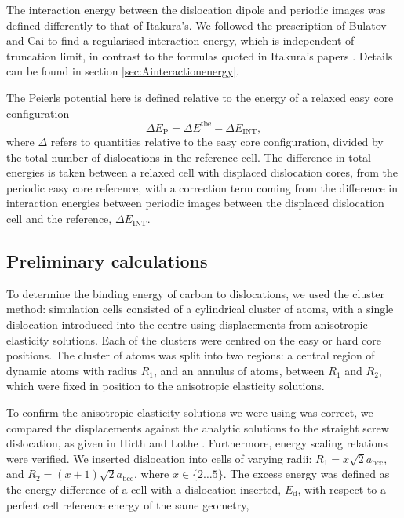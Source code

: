 \documentclass[a4paper,11pt]{article}
\begin{document}
The interaction energy between the dislocation dipole and periodic images was defined differently
to that of Itakura's. We followed the prescription of Bulatov and Cai \cite{vasilybulatov2006} to
find a regularised interaction energy, which is independent of truncation limit, in contrast to
the formulas quoted in Itakura's papers \cite{Itakura2012}. Details can be found in section \ref{sec:Ainteractionenergy}.


The Peierls potential here is defined relative to the energy of a relaxed easy core configuration
\begin{equation}
 \Delta E_{\text{P}} = \Delta E^{\text{tbe}} - \Delta E_{\text{INT}} ,\label{eq:peierlspot} 
 \end{equation} 
where \(\Delta\) refers to
quantities relative to the easy core configuration, divided by the total number of dislocations
in the reference cell.  The difference in total energies is taken between a relaxed cell with
displaced dislocation cores, from the periodic easy core reference, with a correction term coming
from the difference in interaction energies between periodic images between the displaced
dislocation cell and the reference, \(\Delta E_{\text{INT}}\).




\subsection{Preliminary calculations}
\label{sec:org13e4b36}
To determine the binding energy of carbon to dislocations, we used the
cluster method: simulation cells consisted of a cylindrical cluster of
atoms, with a single dislocation introduced into the
centre using displacements from anisotropic elasticity solutions. Each of the clusters
were centred on the easy or hard core positions. The cluster of atoms was
split into two regions: a central region of dynamic atoms with radius \(R_1\),
and an annulus of atoms, between \(R_1\) and \(R_2\), which were fixed in position to the anisotropic
elasticity solutions. 

To confirm the anisotropic elasticity solutions we were using was correct, we compared the
displacements against the analytic solutions to the straight screw dislocation, as given in Hirth
and Lothe \cite{anderson2017theory}. Furthermore, energy scaling relations were verified. We
inserted dislocation into cells of varying radii: \(R_1 = x\sqrt{2}a_{\text{bcc}}\), and \(R_2 =
   (x+1)\sqrt{2}a_{\text{bcc}}\), where \(x \in \{2\dots5\}\). The excess energy
was defined as the energy difference of a cell with a dislocation inserted, \(E_{\text{d}}\), with
respect to a perfect cell reference energy of the same geometry,
\end{document}

